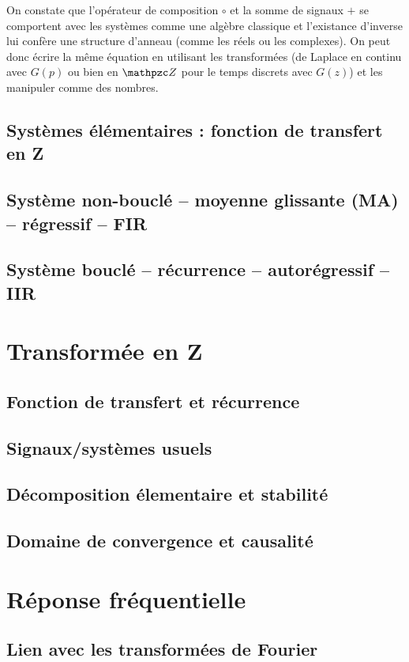 On constate que l'opérateur de composition $\circ$ et la somme de
signaux $+$ se comportent avec les systèmes comme une algèbre classique et l'existance
d'inverse lui confère une structure d'anneau (comme les réels ou les
complexes). On peut donc écrire la même équation en utilisant les
transformées (de Laplace en continu avec $G(p)$ ou bien en $\TZ$ pour le
temps discrets avec $G(z)$) et les manipuler comme des nombres.


\subsection{Systèmes élémentaires : fonction de transfert en Z}
\subsection{Système non-bouclé -- moyenne glissante (MA) -- régressif --
  FIR}
\subsection{Système bouclé -- récurrence -- autorégressif -- IIR}

\section{Transformée en Z}

\subsection{Fonction de transfert et récurrence}
\subsection{Signaux/systèmes usuels}
\subsection{Décomposition élementaire et stabilité}
\subsection{Domaine de convergence et causalité}

\section{Réponse fréquentielle}
\subsection{Lien avec les transformées de Fourier}

